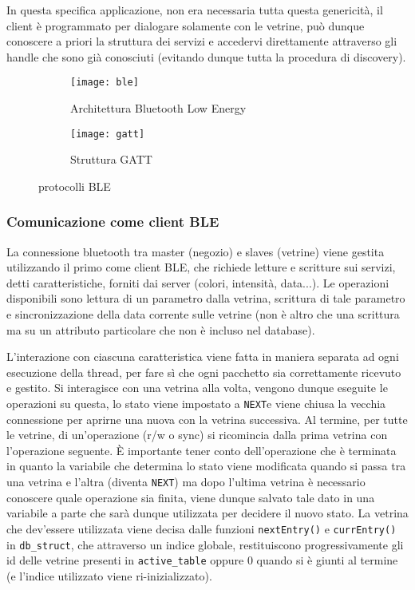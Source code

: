 In questa specifica applicazione, non era necessaria tutta questa genericit\`a, il client \`e programmato per dialogare solamente con le vetrine, pu\`o dunque conoscere a priori la struttura dei servizi e accedervi direttamente attraverso gli handle che sono gi\`a conosciuti (evitando dunque tutta la procedura di discovery).

\begin{figure}[ht]
  \center
  \begin{subfigure}{.65\textwidth}
    \texttt{[image: ble]}
    \caption{Architettura Bluetooth Low Energy}
  \end{subfigure}
  \hfill
  \begin{subfigure}{.25\textwidth}
    \texttt{[image: gatt]}
    \caption{Struttura GATT}
  \end{subfigure}
  \caption{protocolli BLE}
\end{figure}

\subsubsection{Comunicazione come client BLE}


La connessione bluetooth tra master (negozio) e slaves (vetrine) viene gestita utilizzando il primo come client BLE, che richiede letture e scritture sui servizi, detti caratteristiche, forniti dai server (colori, intensit\`a, data...). Le operazioni disponibili sono lettura di un parametro dalla vetrina, scrittura di tale parametro e sincronizzazione della data corrente sulle vetrine (non \`e altro che una scrittura ma su un attributo particolare che non \`e incluso nel database).

L'interazione con ciascuna caratteristica viene fatta in maniera separata ad ogni esecuzione della thread, per fare s\`i che ogni pacchetto sia correttamente ricevuto e gestito. Si interagisce con una vetrina alla volta, vengono dunque eseguite le operazioni su questa, lo stato viene impostato a \texttt{NEXT}e viene chiusa la vecchia connessione per aprirne una nuova con la vetrina successiva. Al termine, per tutte le vetrine, di un'operazione (r/w o sync) si ricomincia dalla prima vetrina con l'operazione seguente. \`E importante tener conto dell'operazione che \`e terminata in quanto la variabile che determina lo stato viene modificata quando si passa tra una vetrina e l'altra (diventa \texttt{NEXT}) ma dopo l'ultima vetrina \`e necessario conoscere quale operazione sia finita, viene dunque salvato tale dato in una variabile a parte che sar\`a dunque utilizzata per decidere il nuovo stato. La vetrina che dev'essere utilizzata viene decisa dalle funzioni \texttt{nextEntry()} e \texttt{currEntry()} in \texttt{db\_struct}, che attraverso un indice globale, restituiscono progressivamente gli id delle vetrine presenti in \texttt{active\_table} oppure 0 quando si \`e giunti al termine (e l'indice utilizzato viene ri-inizializzato).

